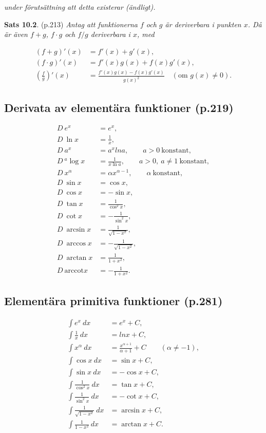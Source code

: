 \documentclass[11pt]{article}
\begin{document}
\textit{under förutsättning att detta existerar (ändligt).}

\textbf{Sats 10.2}. (p.213) \textit{Antag att funktionerna $f$ och $g$ är deriverbara i punkten $x$. Då är även $f+g$, $f \cdot g$ och $f/g$ deriverbara i $x$, med}

\begin{align}
    (f + g)'(x) &= f'(x) + g'(x),\\
    (f \cdot g)'(x) &= f'(x)g(x) + f(x)g'(x),\\
    \left(\frac{f}{g}\right)'(x) &= \frac{f'(x)g(x) - f(x)g'(x)}{g(x)^2} \quad (\text{om } g(x) \neq 0).
\end{align}

\newpage
\subsection{Derivata av elementära funktioner (p.219)}

\begin{align}
    D\ e^x &= e^x,\\
    D\ \ln x &= \frac{1}{x},\\
    D\ a^x &= a^x ln a, \qquad a > 0\ \mathrm{konstant},\\
    D\ {}^{a}\log x &= \frac{1}{x \ln a}, \qquad a > 0,\ a \neq 1\ \mathrm{konstant},\\
    D\ x^\alpha &= \alpha x^{\alpha - 1}, \qquad \alpha\ \mathrm{konstant},\\
    D\ \sin x &= \cos x,\\
    D\ \cos x &= -\sin x,\\
    D\ \tan x &= \frac{1}{\cos^2 x},\\
    D\ \cot x &= -\frac{1}{\sin^2 x},\\
    D\ \arcsin x &= \frac{1}{\sqrt{1 - x^x}},\\
    D\ \arccos x &= -\frac{1}{\sqrt{1 - x^2}},\\
    D\ \arctan x &= \frac{1}{1 + x^2},\\
    D\ \mathrm{arccot} x &= -\frac{1}{1 + x^2}.
\end{align}

\subsection{Elementära primitiva funktioner (p.281)}

\begin{align}
    \int e^{x}\ dx &= e^x + C,\\
    \int \frac{1}{x}\ dx &= ln x + C,\\
    \int x^{\alpha}\ dx &= \frac{x^{\alpha + 1}}{\alpha + 1} + C \qquad (\alpha \neq -1),\\
    \int \cos x\ dx &= \sin x + C,\\
    \int \sin x\ dx &= -\cos x + C,\\
    \int \frac{1}{\cos^2 x}\ dx &= \tan x + C,\\
    \int \frac{1}{\sin^2 x}\ dx &= -\cot x + C,\\
    \int \frac{1}{\sqrt{1 - x^2}}\ dx &= \arcsin x + C,\\
    \int \frac{1}{1 - x^2}\ dx &= \arctan x + C.
\end{align}
\end{document}
